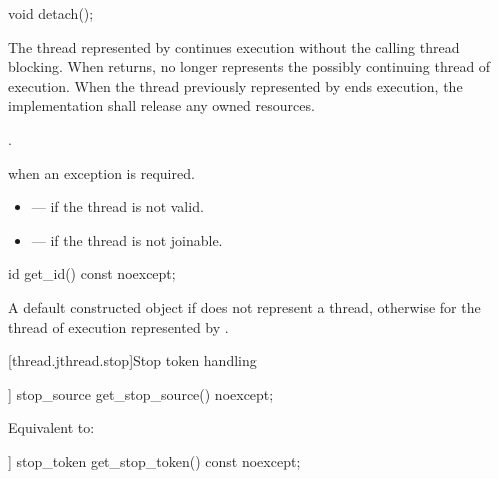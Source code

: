 %
\begin{itemdecl}
void detach();
\end{itemdecl}

\begin{itemdescr}
\pnum
\effects
The thread represented by  continues execution
without the calling thread blocking.
When  returns,
 no longer represents the possibly continuing thread of execution.
When the thread previously represented by  ends execution,
the implementation shall release any owned resources.

\pnum
\ensures
{}.

\pnum
\throws
{} when an exception is required.

\pnum
\errors
\begin{itemize}
\item {} --- if the thread is not valid.
\item {} --- if the thread is not joinable.
\end{itemize}
\end{itemdescr}

%
\begin{itemdecl}
id get_id() const noexcept;
\end{itemdecl}

\begin{itemdescr}
\pnum
\returns
A default constructed  object
if  does not represent a thread,
otherwise 
for the thread of execution represented by .
\end{itemdescr}

[thread.jthread.stop]{Stop token handling}

%
\begin{itemdecl}
[[nodiscard]] stop_source get_stop_source() noexcept;
\end{itemdecl}

\begin{itemdescr}
\pnum
\effects
Equivalent to: 
\end{itemdescr}

%
\begin{itemdecl}
[[nodiscard]] stop_token get_stop_token() const noexcept;
\end{itemdecl}

